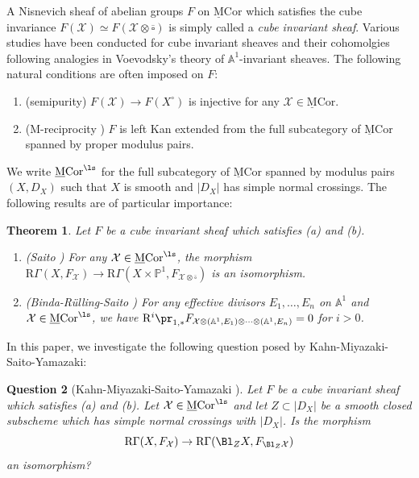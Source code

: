 \documentclass{amsart}
\theoremstyle{plain}
\newtheorem{theorem}{Theorem}[section]
\newtheorem{question}[theorem]{Question}
\theoremstyle{definition}
\theoremstyle{remark}
\numberwithin{equation}{section}
\def\bcube{{\overline{\square}}}
\def\RGamma{\mathrm{R}\Gamma}
\def\MCor{\mathrm{\underline{M}Cor}}
\begin{document}
A Nisnevich sheaf of abelian groups $F$ on $\MCor$ which satisfies the cube invariance $F(\mathcal{X})\simeq F(\mathcal{X}\otimes\bcube)$ is simply called a \emph{cube invariant sheaf}.
Various studies have been conducted for cube invariant sheaves and their cohomolgies following analogies in Voevodsky's theory of $\mathbb{A}^1$-invariant sheaves.
The following natural conditions are often imposed on $F$:
\begin{enumerate}
	\item[(a)]	(semipurity) $F(\mathcal{X})\to F(X^\circ)$ is injective for any $\mathcal{X}\in \MCor$.
	\item[(b)]	(M-reciprocity \cite[Definition 1.26]{Sai20}) $F$ is left Kan extended from the full subcategory of $\MCor$ spanned by proper modulus pairs.
\end{enumerate}

We write $\MCor^\ls$ for the full subcategory of $\MCor$ spanned by modulus pairs $(X,D_X)$ such that $X$ is smooth and $|D_X|$ has simple normal crossings.
The following results are of particular importance:

\begin{theorem}\label{Saito_BRS}
    Let $F$ be a cube invariant sheaf which satisfies (a) and (b).
    \begin{enumerate}
        \item (Saito \cite[Theorem 9.3]{Sai20}) For any $\mathcal{X}\in \MCor^\ls$, the morphism $\RGamma(X,F_\mathcal{X})\to \RGamma(X\times\mathbb{P}^1,F_{\mathcal{X}\otimes \bcube})$ is an isomorphism.
        \item (Binda-R\"ulling-Saito \cite[Lemma 2.10]{BRS}) For any effective divisors $E_1,\dots,E_n$ on $\mathbb{A}^1$ and $\mathcal{X}\in \MCor^\ls$, we have $\mathrm{R}^i\pr_{1,*}F_{\mathcal{X}\otimes(\mathbb{A}^1,E_1)\otimes\cdots\otimes(\mathbb{A}^1,E_n)}=0$ for $i>0$.
    \end{enumerate}
\end{theorem}

In this paper, we investigate the following question posed by Kahn-Miyazaki-Saito-Yamazaki: 

\begin{question}[Kahn-Miyazaki-Saito-Yamazaki {\cite[Question 2]{KMSY1}}]\label{KMSY_question}
    Let $F$ be a cube invariant sheaf which satisfies (a) and (b).
    Let $\mathcal{X}\in \MCor^\ls$ and let $Z\subset |D_X|$ be a smooth closed subscheme which has simple normal crossings with $|D_X|$.
    Is the morphism
    $$
        \RGamma(X,F_\mathcal{X})\to \RGamma(\Bl_ZX,F_{\Bl_Z\mathcal{X}})
    $$
    an isomorphism?
\end{question}
\end{document}
